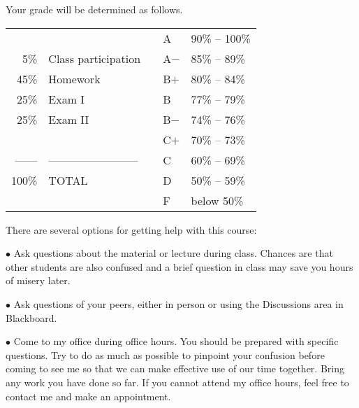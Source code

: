 \documentclass[11pt]{article}
\begin{document}
Your grade will be determined as follows. 

\medskip


\begin{tabular}{rlp{4cm}ll}
& & & A & 90\% -- 100\%\\
5\% & Class participation & & A$-$ & 85\% -- 89\%\\
45\% & Homework & & B$+$ & 80\% -- 84\%\\
25\% &  Exam I & & B & 77\% -- 79\%\\ 
25\% & Exam II & & B$-$ & 74\% -- 76\%\\
&  & & C$+$ & 70\% -- 73\%\\
------ & ------------------------ & & C & 60\% -- 69\%\\
100\% & TOTAL  & & D & 50\% -- 59\%\\ 
& & & F & below 50\%
\end{tabular}

\bigskip


There are several options for getting help with this course:

$\bullet$ Ask questions about the material or lecture during
class. Chances are that other students are also confused and a brief
question in class may save you hours of misery later.
  
$\bullet$ Ask questions of your peers, either in person or using the
Discussions area in Blackboard. 


$\bullet$ Come to my office during office hours. You should be
prepared with specific questions. Try to do as much as possible to
pinpoint your confusion before coming to see me so that we can make
effective use of our time together. Bring any work you have done so
far. If you cannot attend my office hours, feel free to contact me and
make an appointment.

  
\end{document}
